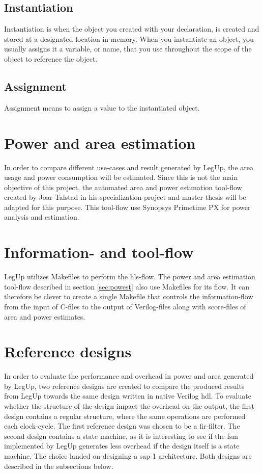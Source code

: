 \subsection{Instantiation}
Instantiation is when the object you created with your declaration, is created and stored at a designated location in memory. When you instantiate an object, you usually assigns it a variable, or name, that you use throughout the scope of the object to reference the object.
\subsection{Assignment}
Assignment means to assign a value to the instantiated object.


\section{\label{sec:powest}Power and area estimation}
In order to compare different use-cases and result generated by LegUp, the area usage and power consumption will be estimated. Since this is not the main objective of this project, the automated area and power estimation tool-flow created by Joar Talstad in his specialization project \cite{talstad14project} and master thesis \cite{talstad15master} will be adapted for this purpose. This tool-flow use Synopsys Primetime PX for power analysis and estimation.

\section{Information- and tool-flow}
LegUp utilizes Makefiles to perform the \gls{hls}-flow. The power and area estimation tool-flow described in section \ref{sec:powest} also use Makefiles for its flow. It can therefore be clever to create a single Makefile that controls the information-flow from the input of C-files to the output of Verilog-files along with score-files of area and power estimates. 

\section{Reference designs}
\label{sec:refdes}
In order to evaluate the performance and overhead in power and area generated by LegUp, two reference designs are created to compare the produced results from LegUp towards the same design written in native Verilog \gls{hdl}. To evaluate whether the structure of the design impact the overhead on the output, the first design contains a regular structure, where the same operations are performed each clock-cycle. The first reference design was chosen to be a \gls{fir}-filter. The second design contains a state machine, as it is interesting to see if the \gls{fsm} implemented by LegUp generates less overhead if the design itself is a state machine. The choice landed on designing a \gls{sap-1} architecture. Both designs are described in the subsections below.

